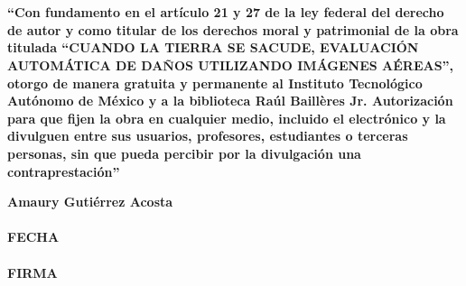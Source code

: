\begin{titlepage}

\hfill\\
\hfill\\


\vspace{4cm}

\textbf{ ``Con fundamento en el art\'iculo 21 y 27 de la ley federal del derecho de autor y como titular de los derechos moral y patrimonial de la obra titulada ``CUANDO LA TIERRA SE SACUDE, EVALUACI\'ON AUTOM\'ATICA DE DA\~NOS UTILIZANDO IM\'AGENES A\'EREAS'', otorgo de manera gratuita y permanente al Instituto Tecnol\'ogico Aut\'onomo de M\'exico y a la biblioteca Ra\'ul Baill\`eres Jr. Autorizaci\'on para que fijen la obra en cualquier medio, incluido el electr\'onico y la divulguen entre sus usuarios, profesores, estudiantes o terceras personas, sin que pueda percibir por la divulgaci\'on una contraprestaci\'on''}

\vspace{1cm}
\begin{center}
\textbf{Amaury Guti\'errez Acosta}\\
\makebox[2in]{\hrulefill}\\
\textbf{FECHA}\\
\makebox[2in]{\hrulefill}\\
\textbf{FIRMA}\\
\end{center}
\medskip




\end{titlepage}
\endinput